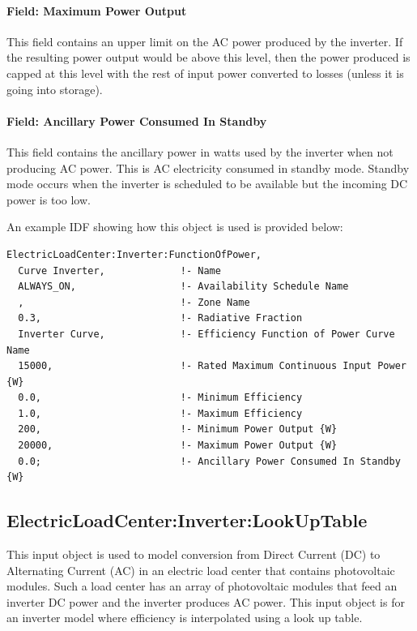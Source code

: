 \paragraph{Field: Maximum Power Output}\label{field-maximum-power-output}

This field contains an upper limit on the AC power produced by the inverter. If the resulting power output would be above this level, then the power produced is capped at this level with the rest of input power converted to losses (unless it is going into storage).

\paragraph{Field: Ancillary Power Consumed In Standby}\label{field-ancillary-power-consumed-in-standby}

This field contains the ancillary power in watts used by the inverter when not producing AC power. This is AC electricity consumed in standby mode. Standby mode occurs when the inverter is scheduled to be available but the incoming DC power is too low.

An example IDF showing how this object is used is provided below:

\begin{lstlisting}
ElectricLoadCenter:Inverter:FunctionOfPower,
  Curve Inverter,             !- Name
  ALWAYS_ON,                  !- Availability Schedule Name
  ,                           !- Zone Name
  0.3,                        !- Radiative Fraction
  Inverter Curve,             !- Efficiency Function of Power Curve Name
  15000,                      !- Rated Maximum Continuous Input Power {W}
  0.0,                        !- Minimum Efficiency
  1.0,                        !- Maximum Efficiency
  200,                        !- Minimum Power Output {W}
  20000,                      !- Maximum Power Output {W}
  0.0;                        !- Ancillary Power Consumed In Standby {W}
\end{lstlisting}

\subsection{ElectricLoadCenter:Inverter:LookUpTable}\label{electricloadcenterinverterlookuptable}

This input object is used to model conversion from Direct Current (DC) to Alternating Current (AC) in an electric load center that contains photovoltaic modules. Such a load center has an array of photovoltaic modules that feed an inverter DC power and the inverter produces AC power. This input object is for an inverter model where efficiency is interpolated using a look up table.

